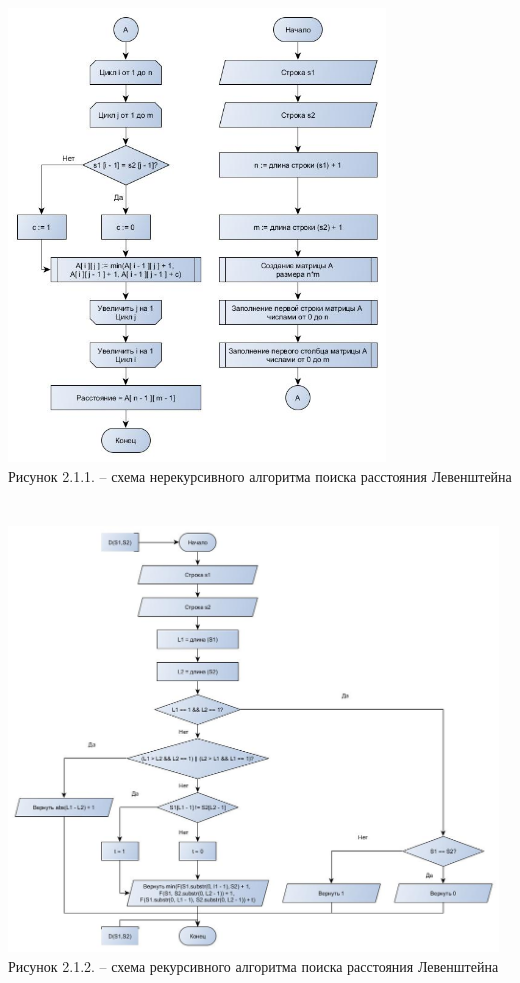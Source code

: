 \documentclass{article}
\begin{document}
\small 
	\includegraphics[width=10cm]{a}\\
	Рисунок 2.1.1. – схема нерекурсивного алгоритма поиска расстояния Левенштейна
	\\
	\\
\\
	\includegraphics[width=13cm]{c}\\
	Рисунок 2.1.2. – схема рекурсивного алгоритма поиска расстояния Левенштейна
	\\
\end{document}
